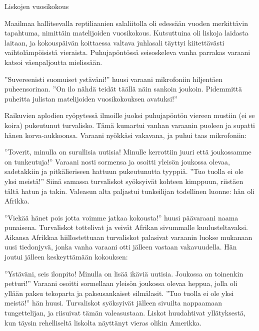 \dlcpage

\headerfooteroff{}
{\large Liskojen vuosikokous}\\
\vspace{1mm}

{\small Maailmaa hallitsevalla reptiliaanien salaliitolla oli edes\-sään vuoden merkittävin tapahtuma, nimittäin matelijoiden vuosi\-kokous. Kutsuttuina oli liskoja laidasta laitaan, ja ko\-kous\-päi\-vän koit\-taessa valtava juhlasali täyttyi kiitettävästi vaihtolämpöisistä vie\-rais\-ta. Puhujapöntössä seisoskeleva van\-ha parrakas varaani katsoi väenpaljoutta mielissään.\\
\vspace{1mm}

''Suvereenisti suomuiset ystäväni!'' huusi varaani mikro\-foniin hiljentäen puheensorinan. ''On ilo nähdä teidät täällä näin sankoin joukoin. Pidemmittä puheitta julistan ma\-te\-li\-joi\-den vuosikokouksen avatuksi!''\\
\vspace{1mm}

Raikuvien aplodien ryöpytessä ilmoille juoksi puhuja\-pön\-tön viereen mustiin (ei se koira) pukeutunut turvalisko. Tämä kumartui vanhan varaanin puoleen ja supatti hänen korva-aukkoonsa. Varaani nyökkäsi vakavana, ja puhui taas mikro\-foniin:\\
\vspace{1mm}

''Toverit, minulla on surullisia uutisia! Minulle kerrottiin juuri että joukossamme on tunkeutuja!'' Varaani nosti sor\-men\-sa ja osoitti yleisön joukossa olevaa, sade\-takkiin ja pitkä\-lieri\-seen hattuun pukeutunutta tyyppiä. ''Tuo tuolla ei ole yksi meistä!'' Siinä samassa turvaliskot syöksyivät kohteen kimppuun, riis\-tä\-en tältä hatun ja takin. Valeasun alta pal\-jas\-tui tunkeilijan todel\-linen luonne: hän oli Afrikka.\\
\vspace{1mm}

''Viekää hänet pois jotta voimme jatkaa kokousta!'' huusi päävaraani naama punaisena. Turvaliskot tottelivat ja veivät Afrikan sivummalle kuulusteltavaksi. Aikansa Afrikkaa hiil\-los\-tet\-tuaan turvaliskot palasivat varaanin luokse mukanaan uusi tiedon\-jyvä, jonka vanha varaani otti jälleen vastaan vakavuudella. Hän joutui jälleen keskeyttämään kokouksen:\\
\vspace{1mm}

''Ystäväni, seis ilonpito! Minulla on lisää ikäviä uutisia. Joukossa on toinenkin petturi!'' Varaani osoitti sormellaan yleisön joukossa olevaa heppua, jolla oli yllään paksu teko\-parta ja paksusankaiset silmälasit. ''Tuo tuolla ei ole yksi meistä!'' hän huusi. Turvaliskot syöksyivät jälleen sivuilta nappaamaan tungettelijan, ja riisuivat tämän valeasustaan. Liskot huu\-dah\-ti\-vat yllätyksestä, kun täysin rehelliseltä lis\-kol\-ta näyttänyt vieras olikin Amerikka.\\
\vspace{1mm}

}

